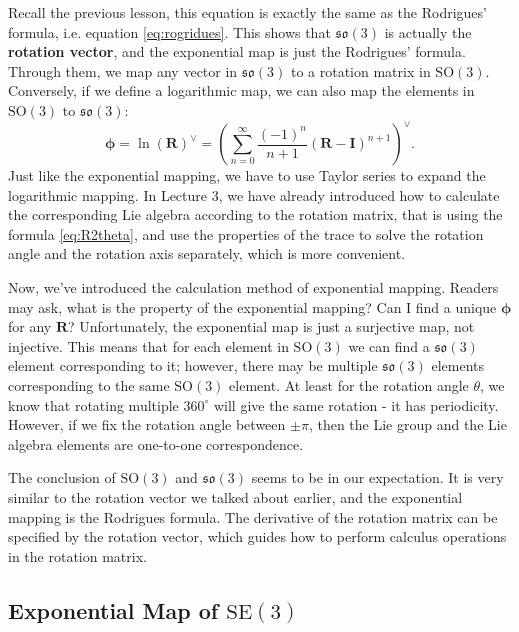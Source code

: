 Recall the previous lesson, this equation is exactly the same as the Rodrigues' formula, i.e. equation \eqref{eq:rogridues}. This shows that $\mathfrak{so}(3)$ is actually the \textbf{rotation vector}, and the exponential map is just the Rodrigues' formula. Through them, we map any vector in $\mathfrak{so}(3)$ to a rotation matrix in $\mathrm{SO}(3)$. Conversely, if we define a logarithmic map, we can also map the elements in $\mathrm{SO}(3)$ to $\mathfrak{so}(3)$:
\begin{equation}
\boldsymbol{\phi} = \ln {\left( \mathbf{R} \right)^ \vee } = {\left( {\sum\limits_{n = 0}^\infty {\frac{{{{ \left( { - 1} \right)}^n}}}{{n + 1}}{{\left( { \mathbf{R} - \mathbf{I}} \right)}^{n + 1 }}} } \right)^ \vee }.
\end{equation}
Just like the exponential mapping, we have to use Taylor series to expand the logarithmic mapping. In Lecture 3, we have already introduced how to calculate the corresponding Lie algebra according to the rotation matrix, that is using the formula \eqref{eq:R2theta}, and use the properties of the trace to solve the rotation angle and the rotation axis separately, which is more convenient.

Now, we've introduced the calculation method of exponential mapping. Readers may ask, what is the property of the exponential mapping? Can I find a unique $\boldsymbol{\phi}$ for any $\mathbf{R}$? Unfortunately, the exponential map is just a surjective map, not injective. This means that for each element in $\mathrm{SO}(3)$ we can find a $\mathfrak{so}(3)$ element corresponding to it; however, there may be multiple $\mathfrak{so}(3)$ elements corresponding to the same $\mathrm{SO}(3)$ element. At least for the rotation angle $\theta$, we know that rotating multiple $360^\circ$ will give the same rotation - it has periodicity. However, if we fix the rotation angle between $\pm \pi$, then the Lie group and the Lie algebra elements are one-to-one correspondence.

The conclusion of $\mathrm{SO}(3)$ and $\mathfrak{so}(3)$ seems to be in our expectation. It is very similar to the rotation vector we talked about earlier, and the exponential mapping is the Rodrigues formula. The derivative of the rotation matrix can be specified by the rotation vector, which guides how to perform calculus operations in the rotation matrix.

\subsection{Exponential Map of $\mathrm{SE}(3)$}

